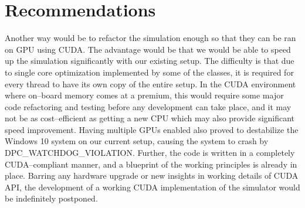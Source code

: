\chapter{Recommendations}
Another way would be to refactor the simulation enough so that they can be ran on GPU using CUDA. The advantage would be that we would be able to speed up the simulation significantly with our existing setup. The difficulty is that due to single core optimization implemented by some of the classes, it is required for every thread to have its own copy of the entire setup. In the CUDA environment where on--board memory comes at a premium, this would require some major code refactoring and testing before any development can take place, and it may not be as cost--efficient as getting a new CPU which may also provide significant speed improvement. Having multiple GPUs enabled also proved to destabilize the Windows 10 system on our current setup, causing the system to crash by DPC\_WATCHDOG\_VIOLATION.  Further, the code is written in a completely CUDA--compliant manner, and a blueprint of the working principles is already in place. Barring any hardware upgrade or new insights in working details of CUDA API, the development of a working CUDA implementation of the simulator would be indefinitely postponed.
